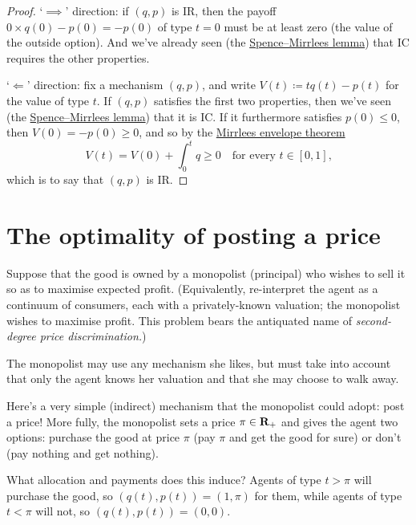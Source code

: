 \begin{proof}
	`$\implies$' direction:
	if $(q,p)$ is IR, then the payoff $0 \times q(0) - p(0) = -p(0)$ of type $t=0$ must be at least zero (the value of the outside option).
	And we've already seen (the \hyperref[proposition:SM_lemma]{Spence--Mirrlees lemma}) that IC requires the other properties.

	`$\Longleftarrow$' direction:
	fix a mechanism $(q,p)$, and
	write $V(t) \coloneqq t q(t) - p(t)$ for the value of type $t$.
	If $(q,p)$ satisfies the first two properties, then we've seen (the \hyperref[proposition:SM_lemma]{Spence--Mirrlees lemma}) that it is IC.
	If it furthermore satisfies $p(0) \leq 0$,
	then $V(0) = -p(0) \geq 0$,
	and so by the \hyperref[proposition:ic_env]{Mirrlees envelope theorem}
	\begin{equation*}
		V(t) = V(0) + \int_0^t q \geq 0 
		\quad \text{for every $t \in [0,1]$,}
	\end{equation*}
	which is to say that $(q,p)$ is IR.
\end{proof}



\section{The optimality of posting a price}
\label{sec:ch1:post}

Suppose that the good is owned by a monopolist (principal) who wishes to sell it so as to maximise expected profit.
(Equivalently, re-interpret the agent as a continuum of consumers, each with a privately-known valuation; the monopolist wishes to maximise profit. This problem bears the antiquated name of \emph{second-degree price discrimination.})

The monopolist may use any mechanism she likes, but must take into account that only the agent knows her valuation and that she may choose to walk away.

Here's a very simple (indirect) mechanism that the monopolist could adopt: post a price!
More fully, the monopolist sets a price $\pi \in \mathbf{R}_+$
and gives the agent two options:
purchase the good at price $\pi$ (pay $\pi$ and get the good for sure)
or don't (pay nothing and get nothing).

What allocation and payments does this induce?
Agents of type $t > \pi$ will purchase the good, so $(q(t),p(t)) = (1,\pi)$ for them, while agents of type $t < \pi$ will not, so $(q(t),p(t)) = (0,0)$.

